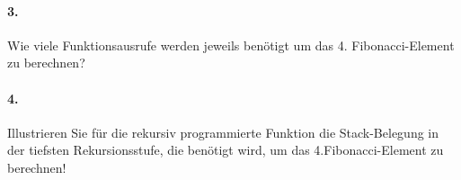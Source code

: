 \documentclass[paper=a4, fontsize=11pt]{scrartcl}
\numberwithin{equation}{section}
\numberwithin{figure}{section}
\numberwithin{table}{section}
\begin{document}
\paragraph{3.}
Wie viele Funktionsausrufe werden jeweils benötigt um das 4. Fibonacci-Element zu berechnen?

\paragraph{4.}
Illustrieren Sie für die rekursiv programmierte Funktion die Stack-Belegung in der tiefsten Rekursionsstufe, die benötigt wird, um das 4.Fibonacci-Element zu berechnen!

\end{document}

